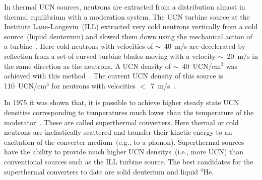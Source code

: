 In thermal UCN sources, neutrons are extracted from a distribution
almost in thermal equilibrium with a moderation system.  The UCN
turbine source at the Institute Laue-Langevin~(ILL) extracted very
cold neutrons vertically from a cold source~(liquid deuterium) and
slowed them down using the mechanical action of a
turbine~\cite{Steyerl1986,Steyerl1975}. Here cold neutrons with
velocities of $\sim$~40~m/s are decelerated by reflection from a set
of curved turbine blades moving with a velocity $\sim$~20~m/s in the
same direction as the neutrons. A UCN density of $\sim$~40~UCN/cm$^3$
was achieved with this method~\cite{ucnbook,Albert_talk}. The current
UCN density of this source is 110~UCN/cm$^3$ for neutrons with
velocities $<$~7~m/s~\cite{Steyerl1986}.


In 1975 it was shown that, it is possible to achieve higher steady
state UCN densities corresponding to temperatures much lower than the
temperature of the moderator~\cite{Golub75}. These are called
superthermal converters. Here thermal or cold neutrons are
inelastically scattered and transfer their kinetic energy to an
excitation of the converter medium~(e.g., to a phonon).
Superthermal sources have the ability to provide much higher UCN
densitys~(i.e., more UCN) than conventional sources such as the
ILL turbine source.  The best candidates for the superthermal
converters to date are solid deuterium and liquid $^4$He.




